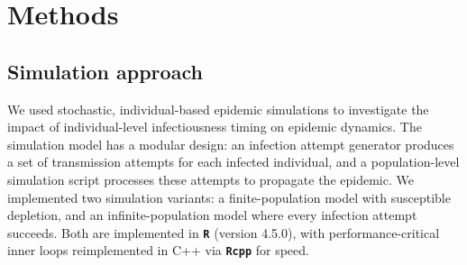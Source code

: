\clearpage
\section{Methods}

\subsection{Simulation approach}
\label{sec:methods_simulation}

We used stochastic, individual-based epidemic simulations to investigate the impact of individual-level infectiousness timing on epidemic dynamics. The simulation model has a modular design: an infection attempt generator produces a set of transmission attempts for each infected individual, and a population-level simulation script processes these attempts to propagate the epidemic. We implemented two simulation variants: a finite-population model with susceptible depletion, and an infinite-population model where every infection attempt succeeds. Both are implemented in {\bf \texttt{R}} (version 4.5.0), with performance-critical inner loops reimplemented in C++ via {\bf \texttt{Rcpp}} for speed.

